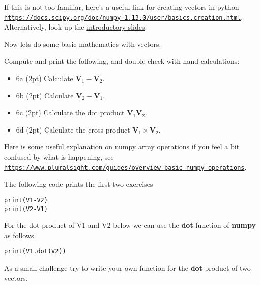 \documentclass[%
oneside,                 %
final,                   %
10pt]{article}
\begin{document}
If this is not too familiar, here's a useful link for creating vectors in python
\href{{https://docs.scipy.org/doc/numpy-1.13.0/user/basics.creation.html}}{\nolinkurl{https://docs.scipy.org/doc/numpy-1.13.0/user/basics.creation.html}}. Alternatively, look up the \href{{https://mhjensen.github.io/Physics321/doc/pub/week2/html/week2.html}}{introductory slides}.

Now lets do some basic mathematics with vectors.

Compute and print the following, and double check with hand calculations:

\begin{itemize}
\item 6a (2pt)  Calculate $\bm{V}_1-\bm{V}_2$.

\item 6b (2pt)  Calculate $\bm{V}_2-\bm{V}_1$.

\item 6c (2pt) Calculate the dot product $\bm{V}_1\bm{V}_2$.

\item 6d (2pt) Calculate the cross product $\bm{V}_1\times\bm{V}_2$.
\end{itemize}

\noindent
Here is some useful explanation on numpy array operations if you feel a bit confused by what is happening,
see \href{{https://www.pluralsight.com/guides/overview-basic-numpy-operations}}{\nolinkurl{https://www.pluralsight.com/guides/overview-basic-numpy-operations}}.

The following code prints the first two exercises



\begin{verbatim}
print(V1-V2)
print(V2-V1)

\end{verbatim}


For the dot product of V1 and V2 below we can use the \textbf{dot} function of \textbf{numpy} as follows


\begin{verbatim}
print(V1.dot(V2))

\end{verbatim}

As a small challenge try to write your own function for the \textbf{dot} product of two vectors.
\end{document}

